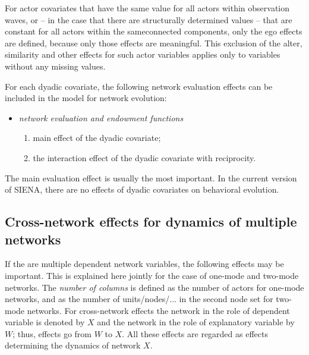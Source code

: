 \documentclass[a4paper,fleqn]{article}
\newcommand{\+}{\, + \,}
\newcommand{\si}{{\sf SIENA}}
\begin{document}
{For actor covariates that have the same value for all actors within observation waves,
or -- in the case that there are structurally determined values --
that are constant for all actors within the sameconnected components,
only the ego effects are defined, because only those
effects are meaningful.
This exclusion of the alter, similarity and other effects for
such actor variables applies only to variables without any missing values.

For each dyadic covariate, the following network evaluation effects
can be included in the model for network evolution:
\begin{itemize}
\item {\em network evaluation and endowment functions}
\begin{enumerate}
\item main effect of the dyadic covariate;
\item the interaction
effect of the dyadic covariate with reciprocity.
\end{enumerate}
\end{itemize}
The main evaluation effect is usually the most important. In the
current version of \si, there are no effects of dyadic covariates
on behavioral evolution.

\subsection{Cross-network effects for dynamics of multiple networks}

If the are multiple dependent network variables,
the following effects may be important.
This is explained here jointly for the case of one-mode and two-mode
networks. The \emph{number of columns} is defined as the number of actors
for one-mode networks, and as the number of units/nodes/...
in the second node set for two-mode networks.
For cross-network effects the network in the role of dependent variable
is denoted by $X$ and the network in the role of explanatory variable
by $W$; thus, effects go from $W$ to $X$.
All these effects are regarded as effects determining the dynamics of network $X$.

}
\end{document}
